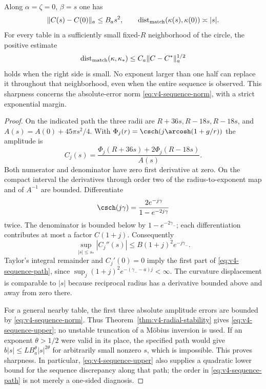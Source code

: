\begin{theorem}
\label{thm:v4-sequence-stability}
Along $\alpha=\zeta=0$, $\beta=s$ one has
\begin{equation}\label{eq:v4-sequence-path}
 \|C(s)-C(0)\|_a\le B_a s^2,
 \qquad
 \operatorname{dist}_{\rm match}(\kappa(s),\kappa(0))\asymp|s|.
\end{equation}
For every table in a sufficiently small fixed-$R$ neighborhood of the
circle, the positive estimate
\begin{equation}\label{eq:v4-sequence-upper}
 \operatorname{dist}_{\rm match}(\kappa,\kappa_*)
                   \le C_a\|C-C^*\|_a^{1/2}
\end{equation}
holds when the right side is small. No exponent larger than one half
can replace it throughout that neighborhood, even when the entire
sequence is observed. This sharpness concerns the absolute-error
norm \eqref{eq:v4-sequence-norm}, with a strict exponential margin.
\end{theorem}
\begin{proof}
On the indicated path the three radii are $R+36s,R-18s,R-18s$,
and $A(s)=A(0)+45\pi s^2/4$. With
$\Phi_j(r)=\csch(j\arcosh(1+g/r))$ the amplitude is
\[
 C_j(s)=\frac{\Phi_j(R+36s)+2\Phi_j(R-18s)}{A(s)}.
\]
Both numerator and denominator have zero first derivative at zero.
On the compact interval the derivatives through order two of the
radius-to-exponent map and of $A^{-1}$ are bounded. Differentiate
\[
 \csch(j\gamma)=\frac{2e^{-j\gamma}}{1-e^{-2j\gamma}}
\]
twice. The denominator is bounded below by $1-e^{-2\gamma_-}$;
each differentiation contributes at most a factor $C(1+j)$.
Consequently
\begin{equation}\label{eq:v4-sequence-second}
 \sup_{|s|\le s_*}|C_j''(s)|
                         \le B(1+j)^2e^{-j\gamma_-}.
\end{equation}
Taylor's integral remainder and $C_j'(0)=0$ imply the first part of
\eqref{eq:v4-sequence-path}, since
$\sup_j(1+j)^2e^{-(\gamma_--a)j}<\infty$.
The curvature displacement is comparable to $|s|$ because reciprocal
radius has a derivative bounded above and away from zero there.

For a general nearby table, the first three absolute amplitude errors
are bounded by \eqref{eq:v4-sequence-norm}. Thus
Theorem~\ref{thm:v4-radial-stability} gives
\eqref{eq:v4-sequence-upper}; no unstable truncation of a M\"obius
inversion is used. If an exponent $\theta>1/2$ were valid in its place,
the specified path would give
$b|s|\le L B_a^\theta|s|^{2\theta}$ for arbitrarily small nonzero
$s$, which is impossible. This proves sharpness. In particular,
\eqref{eq:v4-sequence-upper} also supplies a quadratic lower bound
for the sequence discrepancy along that path; the order in
\eqref{eq:v4-sequence-path} is not merely a one-sided diagnosis.
\end{proof}


